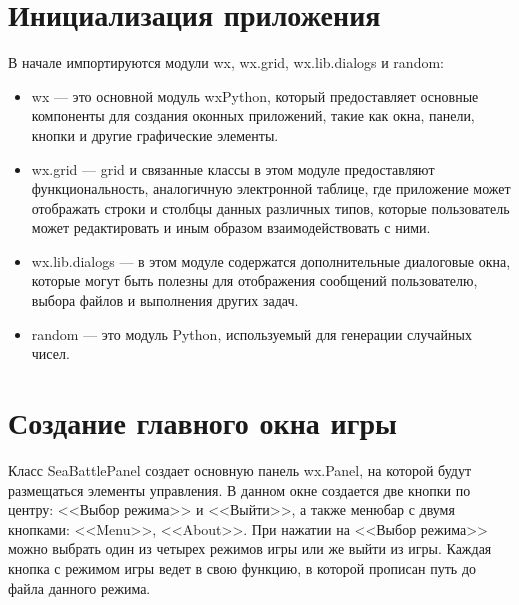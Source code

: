 \section{\label{sec:ch02/sec02}Инициализация приложения}
В начале импортируются модули wx, wx.grid, wx.lib.dialogs и random:
\begin{itemize}
\item wx --- это основной модуль wxPython, который предоставляет основные компоненты для создания оконных приложений, такие как окна, панели, кнопки и другие графические элементы.
\item wx.grid --- grid и связанные классы в этом модуле предоставляют функциональность, аналогичную электронной таблице, где приложение может отображать строки и столбцы данных различных типов, которые пользователь может редактировать и иным образом взаимодействовать с ними.
\item wx.lib.dialogs --- в этом модуле содержатся дополнительные диалоговые окна, которые могут быть полезны для отображения сообщений пользователю, выбора файлов и выполнения других задач.
\item random --- это модуль Python, используемый для генерации случайных чисел.
\end{itemize}

\section{\label{sec:ch02/sec03}Создание главного окна игры}
Класс SeaBattlePanel создает основную панель wx.Panel, на которой будут размещаться элементы управления. В данном окне создается две кнопки по центру: <<Выбор режима>> и <<Выйти>>, а также менюбар с двумя кнопками: <<Menu>>, <<About>>. 
При нажатии на <<Выбор режима>> можно выбрать один из четырех режимов игры или же выйти из игры.
Каждая кнопка с режимом игры ведет в свою функцию, в которой прописан путь до файла данного режима.

